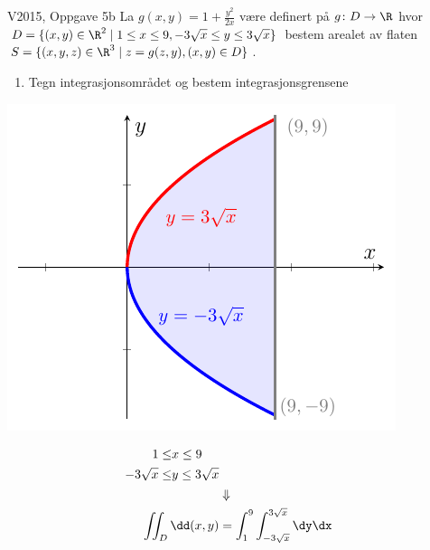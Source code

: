\begin{frame}
  \begin{oppgave}{V2015, Oppgave 5b}
    La $g(x,y) = 1+\frac{y^2}{2x}$ være definert på $g\colon D \to \R$ hvor
    $D = \{(x,y) \in \R^2 \mid 1 \leq x \leq 9, -3 \sqrt{x} \leq y \leq 3 \sqrt{x}\}$
    bestem arealet av flaten $S = \{(x,y,z)\in \R^3 \mid z = g(z,y), (x,y) \in D\}$.
  \end{oppgave}
  \begin{enumerate}
    \item Tegn integrasjonsområdet og bestem integrasjonsgrensene
  \end{enumerate}
  \begin{minipage}[b]{0.45\textwidth}\centering
    \includegraphics{../img/overflateintegral-2015V}
  \end{minipage}\hfill
  \begin{minipage}[b]{0.45\textwidth}\centering\vspace*{-3cm}
  \begin{align*}
    \begin{split}
    1 \leq & x \leq 9 \\
    -3 \sqrt{x} \leq & y \leq 3 \sqrt{x}
  \end{split} \\ \ & \Downarrow \ \\
   \iint_D \dd(x,y) & = \int_1^{9} \int_{-3\sqrt{x}}^{3\sqrt{x}}\dy \dx
  \end{align*}
  \vspace{1cm}
  \phantom{a//a//a//a//a//a//a//a//a//a//a}
  \end{minipage}
\end{frame}

